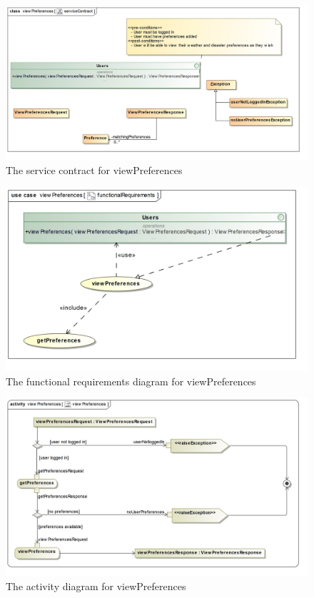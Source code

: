\begin{figure}[H]
	\centering
	\includegraphics[width=1.0\textwidth]{../images/funcReq/viewPreferencesServiceContract.jpg}
	\caption{The service contract for viewPreferences \label{overflow}}
\end{figure}

\begin{figure}[H]
	\centering
	\includegraphics[width=1.0\textwidth]{../images/funcReq/viewPreferencesFunctionalRequirements.jpg}
	\caption{The functional requirements diagram for viewPreferences \label{overflow}}
\end{figure}

\begin{figure}[H]
	\centering
	\includegraphics[width=1.0\textwidth]{../images/funcReq/viewPreferencesActivityDiagram.jpg}
	\caption{The activity diagram for viewPreferences \label{overflow}}
\end{figure}